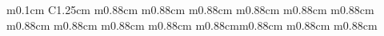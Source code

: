 \begin{ThreePartTable}
{\begin{longtable}{m{0.1cm} C{1.25cm} m{0.88cm} m{0.88cm} m{0.88cm} m{0.88cm} m{0.88cm} m{0.88cm} m{0.88cm} m{0.88cm} m{0.88cm} m{0.88cm} m{0.88cm}m{0.88cm} m{0.88cm} m{0.88cm}}

\end{longtable}}
\end{ThreePartTable}
